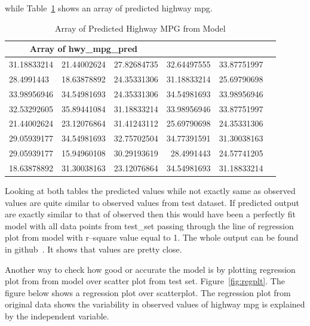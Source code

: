  while Table~\ref{tab:PredMPG} shows an array of 
 predicted highway mpg. 
 
 \begin{table}[htb]
    \centering
    \begin{tabular}{llcrr p{8cm}}
    \hline
    \midrule
    \multicolumn{3}{c}{Array of hwy\_mpg\_pred}\\ \hline
  31.18833214 & 21.44002624 & 27.82684735 & 32.64497555 &  33.87751997 \\						
  28.4991443  &  18.63878892 & 24.35331306 & 31.18833214 & 25.69790698 \\						
  33.98956946 & 34.54981693 & 24.35331306 &  34.54981693 & 33.98956946 \\						
  32.53292605 & 35.89441084 & 31.18833214 &  33.98956946 & 33.87751997 \\						
  21.44002624 & 23.12076864 & 31.41243112 & 25.69790698 & 24.35331306 \\						
  29.05939177 & 34.54981693 & 32.75702504 & 34.77391591 & 31.30038163 \\						
  29.05939177 & 15.94960108 & 30.29193619 & 28.4991443  & 24.57741205 \\						
  18.63878892 & 31.30038163 & 23.12076864 & 34.54981693 & 31.18833214 \\
  \hline
  \midrule
    \end{tabular}
    \caption{Array of Predicted Highway MPG from  Model}
    \label{tab:PredMPG}
\end{table}
 
 Looking at both tables the predicted values while 
 not exactly same as observed values are quite similar to observed values 
 from test dataset. If predicted output are exactly similar to that of 
 observed then this would have been a 
 perfectly fit model with all data points from test\_set passing through the
 line of regression plot from model with r--square value equal to 1.
 The whole output can be found in github~\cite{hid-sp18-415-analysis}.
 It shows that values are pretty close.
 
 Another way to check how good or accurate the model is by plotting regression 
 plot from from model over scatter plot from test set. 
 Figure~\ref{fig:regplt}. The figure below shows a regression plot
 over scatterplot. The regression plot from original data shows the variability
 in observed values of highway mpg is explained by the independent variable.
 
